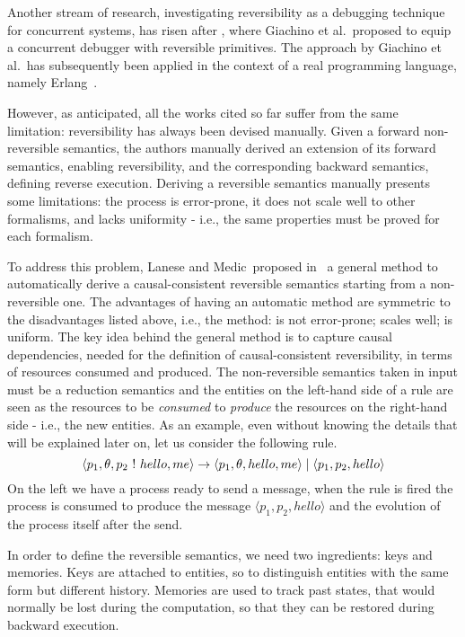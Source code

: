 \documentclass{article}[12pt,a4paper]
\theoremstyle{definition}
\newcommand{\paral}{\;|\;}
\begin{document}
Another stream of research, investigating reversibility as a debugging technique for concurrent systems,
has risen after \cite{GiachinoLM14}, where Giachino et al.~proposed to
equip a concurrent debugger with reversible primitives.
The approach by Giachino et al.~has subsequently been applied in the context of a real programming language, namely Erlang~\cite{LaneseNPV18,Lanese0PV18,Gonzalez-AbrilV21,FabbrettiLS21}.

However, as anticipated, all the works cited so far suffer from the same limitation: reversibility has always been
devised manually. Given a forward non-reversible semantics, the authors manually
derived an extension of its forward semantics, enabling reversibility, and the corresponding backward semantics, defining reverse execution.
Deriving a reversible semantics manually presents some limitations: the
process is error-prone, it does not scale well to other formalisms, and lacks
uniformity - i.e., the same properties must be proved for each formalism.

To address this problem, Lanese and Medic~proposed in~\cite{LaneseM20} a
general method to
automatically derive a causal-consistent reversible semantics starting from a non-reversible one. The
advantages of having an automatic method are symmetric to the disadvantages
listed above, i.e., the method: is not error-prone; scales well; is uniform. The key idea behind the general method is to capture
causal dependencies, needed for the definition of causal-consistent reversibility, in terms of resources consumed and produced. The non-reversible
semantics taken in input must be a reduction semantics and the entities on the
left-hand side of a rule are seen as the resources to be \emph{consumed} to
\emph{produce} the resources on the right-hand side - i.e., the new entities.
As an example, even without knowing the details that will be explained later on, let
us consider the following rule. 
\[\langle p_1, \theta, p_2~\ms{!}~hello, me\rangle \rightarrow \langle p_1, \theta,
  hello, me\rangle \paral\langle p_1, p_2,hello \rangle\]
On the left we have a process ready to send a
message, when the rule is fired the process is consumed to produce the message
$\langle p_1, p_2,hello \rangle$ and the evolution of the process itself after the send.

In order to define the reversible semantics, we need two ingredients: keys and memories.
Keys are attached to entities, so to distinguish entities with the same form but different history.
Memories are used to track past states, that would normally be lost during the computation, so that
they can be restored during backward execution.
\end{document}
